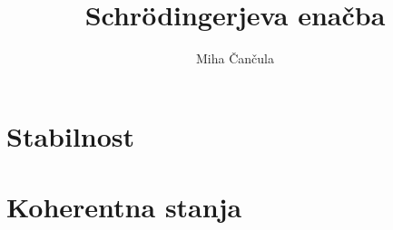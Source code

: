 \documentclass[a4paper,10pt]{article}
\title{Schr\"odingerjeva ena\v cba}
\author{Miha \v Can\v cula}
\begin{document}
\maketitle

\section{Stabilnost}




\section{Koherentna stanja}



\end{document}
